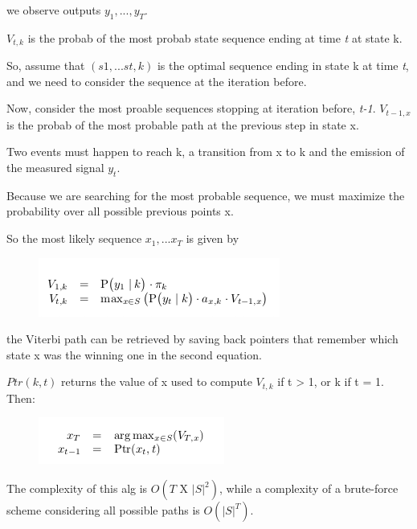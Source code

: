 \documentclass[11pt]{article}
\begin{document}
we observe outputs $ y_1, ..., y_T $.

$ V_{t,k} $ is the probab of the most probab state sequence ending at time \textit{t} at state k.

So, assume that $ (s1, ... s{t}, k) $ is the optimal sequence ending in state k at time \textit{t}, and we need to consider the sequence at the iteration before.

Now, consider the most proable sequences stopping at iteration before, \textit{t-1}. $ V_{t-1, x} $ is the probab of the most probable path at the previous step in state x. 

Two events must happen to reach k, a transition from x to k and the emission of the measured signal $ y_t $.

Because we are searching for the most probable sequence, we must maximize the probability over all possible previous points x.

So the most likely sequence $ x_1, ... x_T $ is given by

\begin{figure}[H]
\includegraphics[scale=0.60]{V}
\centering
\end{figure}

the Viterbi path can be retrieved by saving back pointers that remember which state x was the winning one in the second equation.

$ Ptr(k,t) $ returns the value of x used to compute $ V_{t,k} $ if t > 1, or k if t = 1. Then:

\begin{figure}[H]
\includegraphics[scale=0.60]{x}
\centering
\end{figure}

The complexity of this alg is $ O(T \text{ X } |S|^2) $, while a complexity of a brute-force scheme considering all possible paths is $ O(|S|^T) $.
\end{document}
